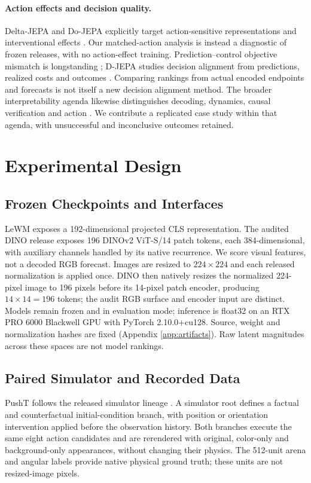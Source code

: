 \paragraph{Action effects and decision quality.}
Delta-JEPA and Do-JEPA explicitly target action-sensitive representations and
interventional effects \citep{zhang2026deltajepa,resani2026dojepa}. Our
matched-action analysis is instead a diagnostic of frozen releases, with no
action-effect training. Prediction--control objective mismatch is longstanding
\citep{lambert2020objectivemismatch}; D-JEPA studies decision alignment from
predictions, realized costs and outcomes \citep{liu2026djepa}. Comparing rankings
from actual encoded endpoints and forecasts is not itself a new decision
alignment method. The broader interpretability agenda likewise distinguishes
decoding, dynamics, causal verification and action
\citep{wang2026worldmodelinterpretability}. We contribute a replicated case
study within that agenda, with unsuccessful and inconclusive outcomes retained.

\section{Experimental Design}
\label{sec:design}

\subsection{Frozen Checkpoints and Interfaces}
LeWM exposes a 192-dimensional projected CLS representation. The audited DINO
release exposes 196 DINOv2 ViT-S/14 patch tokens, each 384-dimensional, with
auxiliary channels handled by its native recurrence. We score visual features,
not a decoded RGB forecast. Images are resized to $224\times224$ and each
released normalization is applied once. DINO then natively resizes the normalized
224-pixel image to 196 pixels before its 14-pixel patch encoder, producing
$14\times14=196$ tokens; the audit RGB surface and encoder input are distinct.
Models remain frozen and in evaluation
mode; inference is float32 on an RTX PRO 6000 Blackwell GPU with PyTorch
2.10.0+cu128. Source, weight and normalization hashes are fixed (Appendix
\ref{app:artifacts}). Raw latent magnitudes across these spaces are not model
rankings.

\subsection{Paired Simulator and Recorded Data}
\label{sec:data}
PushT follows the released simulator lineage
\citep{chi2023diffusionpolicy,maes2026stableworldmodel,oberweger2026pointlewm}.
A simulator root defines a factual and counterfactual initial-condition branch,
with position or orientation intervention applied before the observation
history. Both branches execute the same eight action candidates and are
rerendered with original, color-only and background-only appearances, without
changing their physics. The 512-unit arena and angular labels provide native
physical ground truth; these units are not resized-image pixels.

